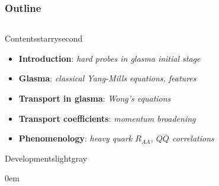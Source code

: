 \documentclass[aspectratio=169,11pt,usenames,dvipsnames]{beamer}
\begin{document}
\begin{frame}
    \frametitle{Outline}
    \vspace{-13pt}

    \begin{center}
        \begin{columns}
                \vspace{5pt}
                \begin{center}
                \begin{custombox2}{\Large Contents}{starrysecond}
                    \footnotesize
                    \begin{varwidth}{0.89\textwidth}
                    \begin{itemize}\itemsep0em 
                        \item {\bfseries\color{starrysecond}Introduction}: {\scriptsize\itshape hard probes in glasma initial stage}
                        \item {\bfseries\color{starrysecond}Glasma}: {\scriptsize\itshape classical Yang-Mills equations, features}
                        \item {\bfseries\color{starrysecond}Transport in glasma}: {\scriptsize\itshape Wong's equations}
                        \item {\bfseries\color{starrysecond}Transport coefficients}: {\scriptsize\itshape momentum broadening}
                        \item {\bfseries\color{starrysecond}Phenomenology}: {\scriptsize\itshape heavy quark $R_{AA}$, $Q\overline{Q}$ correlations}
                    \end{itemize}
                    \end{varwidth}
                \end{custombox2}
                \vspace{15pt}
                \begin{custombox2}{{\color{jyured}\large Developments}}{lightgray}
                    \footnotesize
                    \begin{varwidth}{0.78\textwidth}
                    \begin{itemize}\itemsep0em 

\end{itemize}
\end{varwidth}
\end{custombox2}
\end{center}
\end{columns}
\end{center}
\end{frame}
\end{document}
